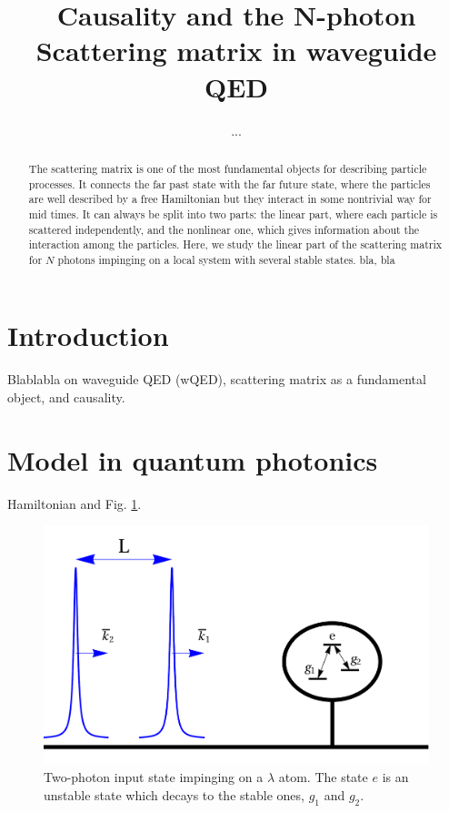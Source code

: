\documentclass[aps,pra,reprint,amsmath,amssymb]{revtex4-1}
\begin{document}
\title{Causality and the N-photon Scattering matrix in waveguide QED}

\author{...}


\begin{abstract}
The scattering matrix is one of the most fundamental objects for
describing particle processes. It connects the far past state with the
far future state, where the particles are well described by a free
Hamiltonian but they interact in some nontrivial way
for mid times. It can always be split into two parts: the linear part,
where each particle is scattered independently, and the nonlinear one,
which gives information about the interaction among the
particles. Here, we study the linear part of the scattering matrix for
$N$ photons impinging on a local system with several stable states. 
bla, bla
\end{abstract}



\maketitle


\section{Introduction}

{\color{blue}Blablabla on waveguide QED (wQED), scattering matrix as a fundamental object, and causality.} \cite{weinberg1995,Xu2016}


\section{Model in quantum photonics} 

{\color{blue}Hamiltonian and Fig. \ref{fig:input}.}

\begin{figure}
\includegraphics[scale=0.25]{input.pdf}
\caption{Two-photon input state impinging on a $\lambda$ atom. The state $e$ is an unstable state which decays to the stable ones, $g_1$ and $g_2$.}
\label{fig:input}
\end{figure}
\end{document}
